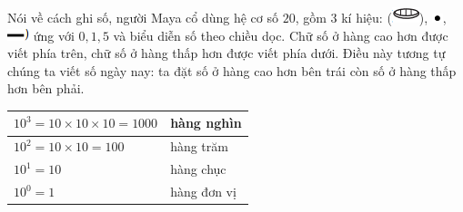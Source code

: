 \begin{multicols}{2}
	Nói về cách ghi số,  người Maya  cổ dùng hệ cơ số $20$, gồm $3$ kí hiệu:  (\includegraphics[scale=0.7]{29}),  \includegraphics[scale=0.7]{30}, \includegraphics[scale=0.7]{31}  ứng với $0,1, 5$ và biểu diễn số theo chiều dọc. Chữ số ở hàng cao hơn được viết phía trên, chữ số ở hàng thấp hơn được viết phía dưới. Điều này tương tự chúng ta viết số ngày nay: ta đặt số ở hàng cao hơn bên trái còn số ở hàng thấp hơn bên phải. 
	\begin{table}[H]
		\vspace*{-5pt}
		\centering
		\setlength{\tabcolsep}{4.5pt}
		\renewcommand{\arraystretch}{1.25}
		\begin{tabular}{|l|l|}
			\hline
			$10^3 = 10\!\times\! 10 \!\times\! 10 =1000$& hàng nghìn\\
			\hline
			$10^2 = 10\!\times\! 10 =100$& hàng trăm\\
			\hline
			$10^1 = 10$& hàng chục\\
			\hline
			$10^0 = 1$& hàng đơn vị\\
			\hline
		\end{tabular}
		\vspace*{-5pt}
	\end{table}

\end{multicols}
